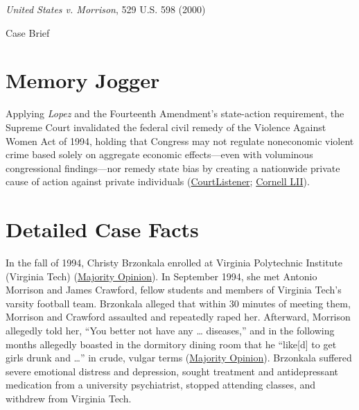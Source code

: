 \documentclass[12pt]{article}
\begin{document}
\begin{center}
{\LARGE \textit{United States v. Morrison}, 529 U.S. 598 (2000)\par}
\vspace{0.8em}
{\large Case Brief\par}
\end{center}
\vspace{1em}

\section{Memory Jogger}
Applying \textit{Lopez} and the Fourteenth Amendment's state-action requirement, the Supreme Court invalidated the federal civil remedy of the Violence Against Women Act of 1994, holding that Congress may not regulate noneconomic violent crime based solely on aggregate economic effects---even with voluminous congressional findings---nor remedy state bias by creating a nationwide private cause of action against private individuals (\href{https://www.courtlistener.com/opinion/118363/united-states-v-morrison/}{CourtListener}; \href{https://www.law.cornell.edu/supct/html/99-5.ZO.html}{Cornell LII}).

\section{Detailed Case Facts}
In the fall of 1994, Christy Brzonkala enrolled at Virginia Polytechnic Institute (Virginia Tech) (\href{https://www.law.cornell.edu/supct/html/99-5.ZO.html}{Majority Opinion}). In September 1994, she met Antonio Morrison and James Crawford, fellow students and members of Virginia Tech's varsity football team. Brzonkala alleged that within 30 minutes of meeting them, Morrison and Crawford assaulted and repeatedly raped her. Afterward, Morrison allegedly told her, ``You better not have any \ldots{} diseases,'' and in the following months allegedly boasted in the dormitory dining room that he ``like[d] to get girls drunk and \ldots{}'' in crude, vulgar terms (\href{https://www.law.cornell.edu/supct/html/99-5.ZO.html}{Majority Opinion}). Brzonkala suffered severe emotional distress and depression, sought treatment and antidepressant medication from a university psychiatrist, stopped attending classes, and withdrew from Virginia Tech.
\end{document}
